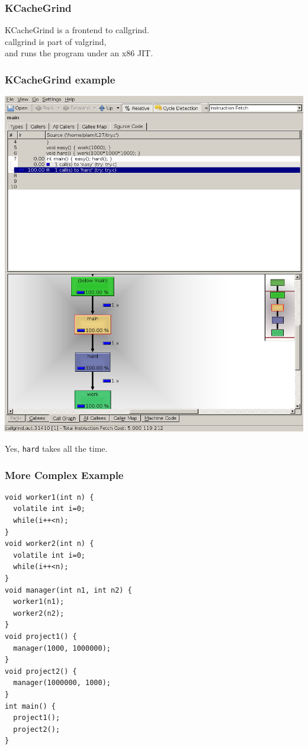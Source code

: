 \begin{frame}
  \frametitle{KCacheGrind}
  
    KCacheGrind is a frontend to callgrind.\\[1em]
    callgrind is part of valgrind,\\
    and runs the program under an x86 JIT.
  
\end{frame}

\begin{frame}
  \frametitle{KCacheGrind example}
  \begin{center}
    \includegraphics[width=.5\textwidth]{images/kcachegrind}
  \end{center}
  
    Yes, {\tt hard} takes all the time.
  
\end{frame}

\begin{frame}[fragile]
  \frametitle{More Complex Example}

  \begin{center}
  \begin{minipage}{.7\textwidth}
\begin{lstlisting}
void worker1(int n) {
  volatile int i=0;
  while(i++<n);
}
void worker2(int n) {
  volatile int i=0;
  while(i++<n);
}
void manager(int n1, int n2) {
  worker1(n1);
  worker2(n2);
}
void project1() {
  manager(1000, 1000000);
}
void project2() {
  manager(1000000, 1000);
}
int main() {
  project1();
  project2();
}
\end{lstlisting}
  \end{minipage}
  \end{center}
  
\end{frame}

